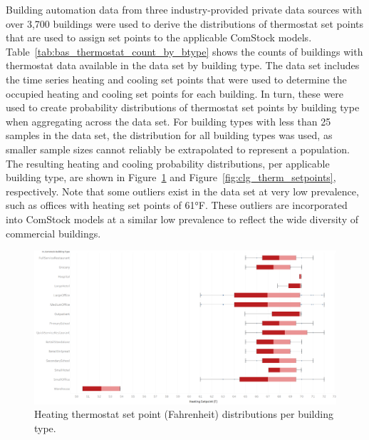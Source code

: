 Building automation data from three industry-provided private data sources with over 3,700 buildings were used to derive the distributions of thermostat set points that are used to assign set points to the applicable ComStock models. Table~\ref{tab:bas_thermostat_count_by_btype} shows the counts of buildings with thermostat data available in the data set by building type. The data set includes the time series heating and cooling set points that were used to determine the occupied heating and cooling set points for each building. In turn, these were used to create probability distributions of thermostat set points by building type when aggregating across the data set. For building types with less than 25 samples in the data set, the distribution for all building types was used, as smaller sample sizes cannot reliably be extrapolated to represent a population. The resulting heating and cooling probability distributions, per applicable building type, are shown in Figure~\ref{fig:htg_therm_setpoints} and Figure~\ref{fig:clg_therm_setpoints}, respectively. Note that some outliers exist in the data set at very low prevalence, such as offices with heating set points of 61°F. These outliers are incorporated into ComStock models at a similar low prevalence to reflect the wide diversity of commercial buildings.



\begin{figure}
    \centering \includegraphics[width=1.0\textwidth]{figures/heating_setpoints.png}
    \caption{Heating thermostat set point (Fahrenheit) distributions per building type.}
    \label{fig:htg_therm_setpoints}
\end{figure}

